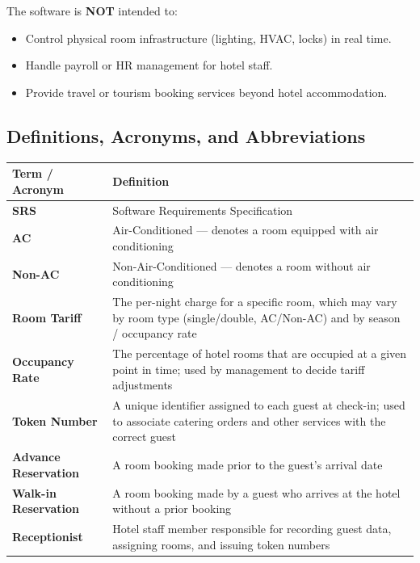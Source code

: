 \documentclass[12pt,a4paper]{article}
\renewcommand{\thead}[1]{%
  \cellcolor{tableheadbg}\color{white}\textbf{#1}%
}
\begin{document}
\noindent The software is \textbf{NOT} intended to:

\begin{itemize}[leftmargin=1.5em]
  \item Control physical room infrastructure (lighting, HVAC, locks) in real time.
  \item Handle payroll or HR management for hotel staff.
  \item Provide travel or tourism booking services beyond hotel accommodation.
\end{itemize}

\subsection{Definitions, Acronyms, and Abbreviations}

\begin{longtable}{|L{3.5cm}|L{10cm}|}
  \hline
  \thead{Term / Acronym} & \thead{Definition} \\
  \hline
  \endhead
  \hline
  \endfoot
  \textbf{SRS}                      & Software Requirements Specification \\
  \hline
  \textbf{AC}                       & Air-Conditioned --- denotes a room equipped with air conditioning \\
  \hline
  \textbf{Non-AC}                   & Non-Air-Conditioned --- denotes a room without air conditioning \\
  \hline
  \textbf{Room Tariff}              & The per-night charge for a specific room, which may vary by room type (single/double, AC/Non-AC) and by season / occupancy rate \\
  \hline
  \textbf{Occupancy Rate}           & The percentage of hotel rooms that are occupied at a given point in time; used by management to decide tariff adjustments \\
  \hline
  \textbf{Token Number}             & A unique identifier assigned to each guest at check-in; used to associate catering orders and other services with the correct guest \\
  \hline
  \textbf{Advance Reservation}      & A room booking made prior to the guest's arrival date \\
  \hline
  \textbf{Walk-in Reservation}      & A room booking made by a guest who arrives at the hotel without a prior booking \\
  \hline
  \textbf{Receptionist}             & Hotel staff member responsible for recording guest data, assigning rooms, and issuing token numbers \\

\end{longtable}
\end{document}
